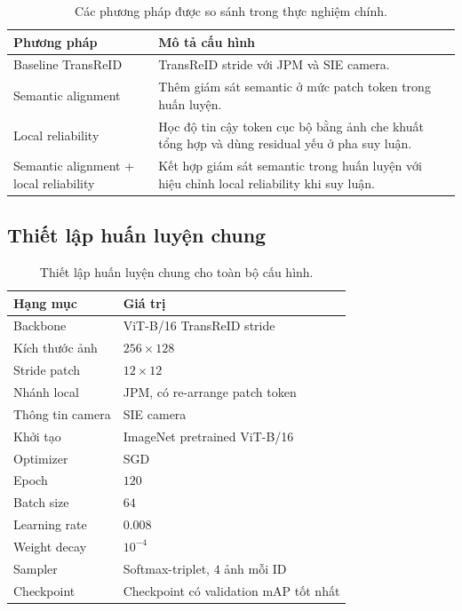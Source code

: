 \begin{table}[H]
\centering
\renewcommand{\arraystretch}{1.12}
\setlength{\tabcolsep}{3pt}
\footnotesize
\begin{tabular}{@{}L{2.8cm}L{5.0cm}@{}}
\toprule
\textbf{Phương pháp} & \textbf{Mô tả cấu hình} \\
\midrule
Baseline TransReID & TransReID stride với JPM và SIE camera. \\
Semantic alignment & Thêm giám sát semantic ở mức patch token trong huấn luyện. \\
Local reliability & Học độ tin cậy token cục bộ bằng ảnh che khuất tổng hợp và dùng residual yếu ở pha suy luận. \\
Semantic alignment + local reliability & Kết hợp giám sát semantic trong huấn luyện với hiệu chỉnh local reliability khi suy luận. \\
\bottomrule
\end{tabular}
\caption{Các phương pháp được so sánh trong thực nghiệm chính.}
\label{tab:appendix_configs}
\end{table}

\subsection{Thiết lập huấn luyện chung}

\begin{table}[H]
\centering
\renewcommand{\arraystretch}{1.12}
\setlength{\tabcolsep}{4pt}
\begin{tabular}{@{}L{2.7cm}L{5.0cm}@{}}
\toprule
\textbf{Hạng mục} & \textbf{Giá trị} \\
\midrule
Backbone & ViT-B/16 TransReID stride \\
Kích thước ảnh & $256 \times 128$ \\
Stride patch & $12 \times 12$ \\
Nhánh local & JPM, có re-arrange patch token \\
Thông tin camera & SIE camera \\
Khởi tạo & ImageNet pretrained ViT-B/16 \\
Optimizer & SGD \\
Epoch & $120$ \\
Batch size & $64$ \\
Learning rate & $0.008$ \\
Weight decay & $10^{-4}$ \\
Sampler & Softmax-triplet, $4$ ảnh mỗi ID \\
Checkpoint & Checkpoint có validation mAP tốt nhất \\
\bottomrule
\end{tabular}
\caption{Thiết lập huấn luyện chung cho toàn bộ cấu hình.}
\label{tab:appendix_training_common}
\end{table}

